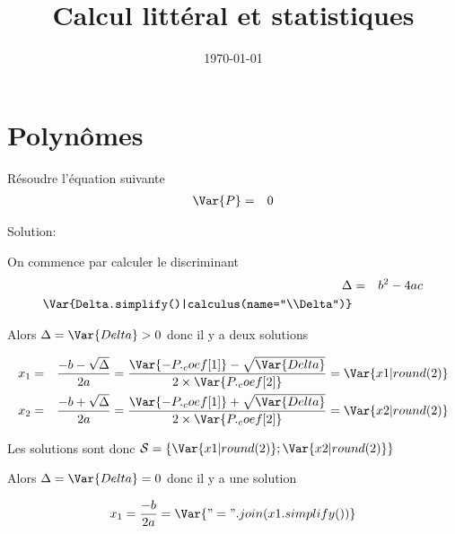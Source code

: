 \documentclass[a4paper,10pt]{article}
\title{Calcul littéral et statistiques}
\date{\today}
\begin{document}
\maketitle


\section{Polynômes}


    Résoudre l'équation suivante
    \begin{eqnarray*}
        \Var{P} & = & 0
    \end{eqnarray*}

    Solution:

    On commence par calculer le discriminant
    \begin{eqnarray*}
        \Delta & = & b^2-4ac \\
        \Var{Delta.simplify()|calculus(name="\\Delta")}
    \end{eqnarray*}

    Alors $\Delta = \Var{Delta} > 0$ donc il y a deux solutions


    \begin{eqnarray*}
        x_1 & = & \frac{-b - \sqrt{\Delta}}{2a} =  \frac{\Var{-P._coef[1]} - \sqrt{\Var{Delta}}}{2 \times \Var{P._coef[2]}} = \Var{x1 | round(2)} \\
        x_2 & = & \frac{-b + \sqrt{\Delta}}{2a} =  \frac{\Var{-P._coef[1]} + \sqrt{\Var{Delta}}}{2 \times \Var{P._coef[2]}} = \Var{x2 | round(2)}
    \end{eqnarray*}

    Les solutions sont donc $\mathcal{S} = \left\{ \Var{x1|round(2)}; \Var{x2|round(2)} \right\}$

    Alors $\Delta = \Var{Delta} = 0$ donc il y a une solution


    \begin{eqnarray*}
        x_1 = \frac{-b}{2a} = \Var{" = ".join(x1.simplify())}
    \end{eqnarray*}
\end{document}
